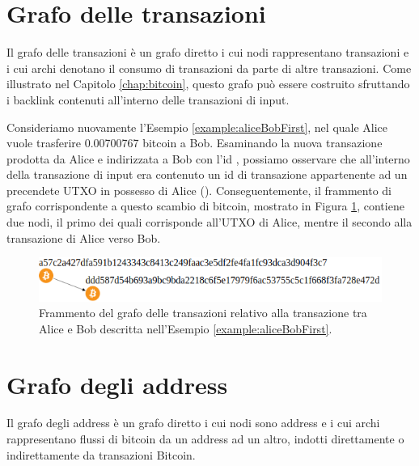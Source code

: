 \section{Grafo delle transazioni} \label{sec:grafoDelleTransazioniProblema}

Il grafo delle transazioni è un grafo diretto i cui nodi rappresentano transazioni e i cui archi denotano il consumo di transazioni da parte di altre transazioni. Come illustrato nel Capitolo \ref{chap:bitcoin}, questo grafo può essere costruito sfruttando i backlink contenuti all’interno delle transazioni di input.

\begin{example}

Consideriamo nuovamente l’Esempio \ref{example:aliceBobFirst}, nel quale Alice vuole trasferire 0.00700767 bitcoin a Bob. Esaminando la nuova  transazione prodotta da Alice e indirizzata a Bob con l’id , possiamo osservare che all’interno della transazione di input era contenuto un id di transazione appartenente ad un precendete UTXO in possesso di Alice (). Conseguentemente, il frammento di grafo corrispondente a questo scambio di bitcoin, mostrato in Figura \ref{fig:graphtxproblem}, contiene due nodi, il primo dei quali corrisponde all'UTXO di Alice, mentre il secondo alla transazione di Alice verso Bob.

\begin{figure}[H]
\centering
\includegraphics[scale=0.35]{images/exampleWithGraph/aliceBoxTx.png}
\caption{Frammento del grafo delle transazioni relativo alla  transazione tra Alice e Bob descritta nell’Esempio \ref{example:aliceBobFirst}.\label{fig:graphtxproblem}}
\end{figure}

\end{example}

\section{Grafo degli address} \label{sec:grafoDegliAddressProblema}

Il grafo degli address è un grafo diretto i cui nodi sono address e i cui archi rappresentano flussi di bitcoin da un address ad un altro, indotti direttamente o indirettamente da transazioni Bitcoin.

